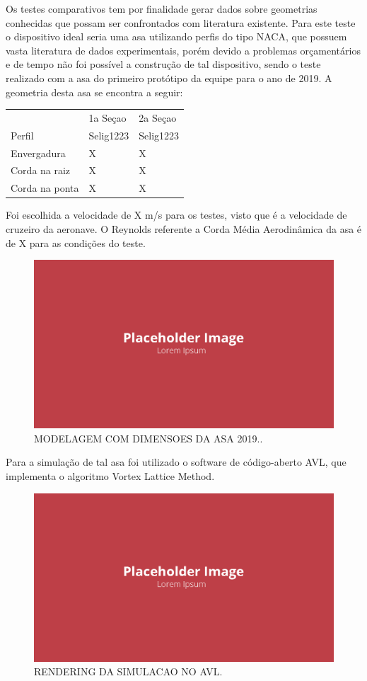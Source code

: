 Os testes comparativos tem por finalidade gerar dados sobre geometrias conhecidas que possam ser confrontados com literatura existente. Para este teste o dispositivo ideal seria uma asa utilizando perfis do tipo NACA, que possuem vasta literatura de dados experimentais, porém devido a problemas orçamentários e de tempo não foi possível a construção de tal dispositivo, sendo o teste realizado com a asa do primeiro protótipo da equipe para o ano de 2019. A geometria desta asa se encontra a seguir:

\begin{table}[]
\centering
\begin{tabular}{lll}
 & 1a Seçao & 2a Seçao \\
Perfil & Selig1223 & Selig1223 \\
Envergadura & X & X \\
Corda na raiz & X & X \\
Corda na ponta & X & X
\end{tabular}
\end{table}

Foi escolhida a velocidade de X m/s para os testes, visto que é a velocidade de cruzeiro da aeronave. O Reynolds referente a Corda Média Aerodinâmica da asa é de X para as condições do teste.

\begin{figure}[!ht]
    \centering
    \includegraphics[width=.8\linewidth]{figuras/outras/placeholder.png}
    \caption{MODELAGEM COM DIMENSOES DA ASA 2019.\cite{autor}.}
    \label{fig:placeholder}
\end{figure}

Para a simulação de tal asa foi utilizado o software de código-aberto AVL, que implementa o algoritmo Vortex Lattice Method.

\begin{figure}[!ht]
    \centering
    \includegraphics[width=.8\linewidth]{figuras/outras/placeholder.png}
    \caption{RENDERING DA SIMULACAO NO AVL\cite{autor}.}
    \label{fig:placeholder}
\end{figure}


